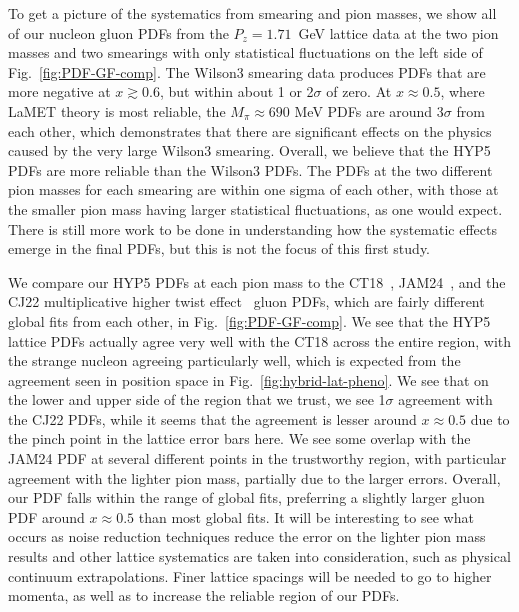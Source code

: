 To get a picture of the systematics from smearing and pion masses, we show all of our nucleon gluon PDFs from the $P_z = 1.71$~GeV lattice data at the two pion masses and two smearings with only statistical fluctuations on the left side of Fig.~\ref{fig:PDF-GF-comp}.
The Wilson3 smearing data produces PDFs that are more negative at $x \gtrsim 0.6$, but within about 1 or 2$\sigma$ of zero.
At $x \approx 0.5$, where LaMET theory is most reliable, the $M_\pi \approx 690$ MeV PDFs are around $3\sigma$ from each other, which demonstrates that there are significant effects on the physics caused by the very large Wilson3 smearing.
Overall, we believe that the HYP5 PDFs are more reliable than the Wilson3 PDFs.
The PDFs at the two different pion masses for each smearing are within one sigma of each other, with those at the smaller pion mass having larger statistical fluctuations, as one would expect.
There is still more work to be done in understanding how the systematic effects emerge in the final PDFs, but this is not the focus of this first study.

We compare our HYP5 PDFs at each pion mass to the CT18~\cite{Hou:2019efy}, JAM24~\cite{Anderson:2024evk}, and the CJ22 multiplicative higher twist effect~\cite{Cerutti:2025yji} gluon PDFs, which are fairly different global fits from each other, in Fig.~\ref{fig:PDF-GF-comp}.
We see that the HYP5 lattice PDFs actually agree very well with the CT18 across the entire region, with the strange nucleon agreeing particularly well, which is expected from the agreement seen in position space in Fig.~\ref{fig:hybrid-lat-pheno}.
We see that on the lower and upper side of the region that we trust, we see 1$\sigma$ agreement with the CJ22 PDFs, while it seems that the agreement is lesser around $x\approx 0.5$ due to the pinch point in the lattice error bars here.
We see some overlap with the JAM24 PDF at several different points in the trustworthy region, with particular agreement with the lighter pion mass, partially due to the larger errors.
Overall, our PDF falls within the range of global fits, preferring a slightly larger gluon PDF around $x\approx 0.5$ than most global fits.
It will be interesting to see what occurs as noise reduction techniques reduce the error on the lighter pion mass results and other lattice systematics are taken into consideration, such as physical continuum extrapolations.
Finer lattice spacings will be needed to go to higher momenta, as well as to increase the reliable region of our PDFs.
